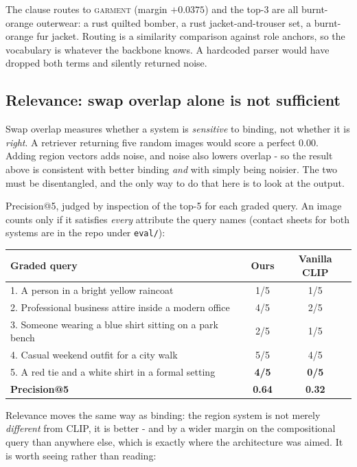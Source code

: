 \documentclass[10pt,a4paper]{article}
\begin{document}
The clause routes to \textsc{garment} (margin $+0.0375$) and the top-3 are all
burnt-orange outerwear: a rust quilted bomber, a rust jacket-and-trouser set, a
burnt-orange fur jacket. Routing is a similarity comparison against role anchors, so the
vocabulary is whatever the backbone knows. A hardcoded parser would have dropped both
terms and silently returned noise.

\subsection{Relevance: swap overlap alone is not sufficient}

Swap overlap measures whether a system is \emph{sensitive} to binding, not whether it is
\emph{right}. A retriever returning five random images would score a perfect 0.00.
Adding region vectors adds noise, and noise also lowers overlap - so the result above
is consistent with better binding \emph{and} with simply being noisier. The two must be
disentangled, and the only way to do that here is to look at the output.

Precision@5, judged by inspection of the top-5 for each graded query. An image counts
only if it satisfies \emph{every} attribute the query names (contact sheets for both
systems are in the repo under \texttt{eval/}):

\begin{center}\small
\begin{tabular}{@{}lcc@{}}
\toprule
\textbf{Graded query} & \textbf{Ours} & \textbf{Vanilla CLIP} \\
\midrule
1. A person in a bright yellow raincoat & 1/5 & 1/5 \\
2. Professional business attire inside a modern office & 4/5 & 2/5 \\
3. Someone wearing a blue shirt sitting on a park bench & 2/5 & 1/5 \\
4. Casual weekend outfit for a city walk & 5/5 & 4/5 \\
5. A red tie and a white shirt in a formal setting & \textbf{4/5} & \textbf{0/5} \\
\midrule
\textbf{Precision@5} & \textbf{0.64} & \textbf{0.32} \\
\bottomrule
\end{tabular}
\end{center}

Relevance moves the same way as binding: the region system is not merely \emph{different}
from CLIP, it is better - and by a wider margin on the compositional query than
anywhere else, which is exactly where the architecture was aimed. It is worth seeing
rather than reading:
\end{document}
